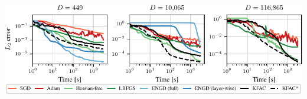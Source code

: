 \documentclass[a0paper]{tikzposter}
\begin{document}
\begin{columns}
{\begin{minipage}[t]{0.28\linewidth}
      \includegraphics[trim={9.5cm 0.5cm 0 0.3cm},clip, width=0.9\linewidth]{../kfac_pinns_exp/exp30_heat4d_groupplot/l2_error_over_time.pdf}
    \end{minipage}
    \hfill

    \vspace{-0.5ex}
  }
\end{columns}
\end{document}
